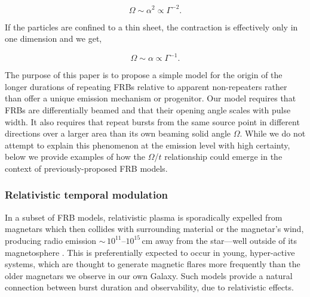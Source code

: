 \documentclass[fleqn,usenatbib]{mnras}
\begin{document}
\begin{equation}
    \Omega\sim\alpha^2\propto\Gamma^{-2}.
\end{equation}

\noindent If the particles are confined to a 
thin sheet, the contraction is effectively only 
in one dimension \citep{katz-2017} and we get,

\begin{equation}
    \Omega\sim\alpha\propto\Gamma^{-1}.
\end{equation}

The purpose of this paper is to propose a simple 
model for the origin of the longer durations of 
repeating FRBs relative to apparent non-repeaters rather 
than offer a unique emission mechanism or progenitor. 
Our model requires that FRBs are differentially beamed 
and that their opening angle scales with pulse width.
It also requires that repeat bursts from the same source 
point in different directions over a larger 
area than its own beaming solid angle $\Omega$.
While we do not attempt to explain this phenomenon 
at the emission level with high certainty, below 
we provide examples of how the $\Omega$/$t$ relationship
could emerge in the context of previously-proposed 
FRB models.

\subsubsection{Relativistic temporal modulation}

In a subset of FRB models, relativistic plasma is sporadically expelled 
from magnetars which then collides with 
surrounding material or the magnetar's wind, producing 
radio emission $\sim$\,$10^{11}$--$10^{15}$\,cm away from the star---well 
outside of its magnetosphere \citep{lyubarsky-2014,beloborodov-2017, metzger-2019, margalit18,  beloborodov-2019}. 
This is preferentially expected to occur in 
young, hyper-active systems, which are thought to generate 
magnetic flares more frequently than the older magnetars we observe in
our own Galaxy. Such models provide a natural connection 
between burst duration and observability, due to relativistic effects. 
\end{document}
